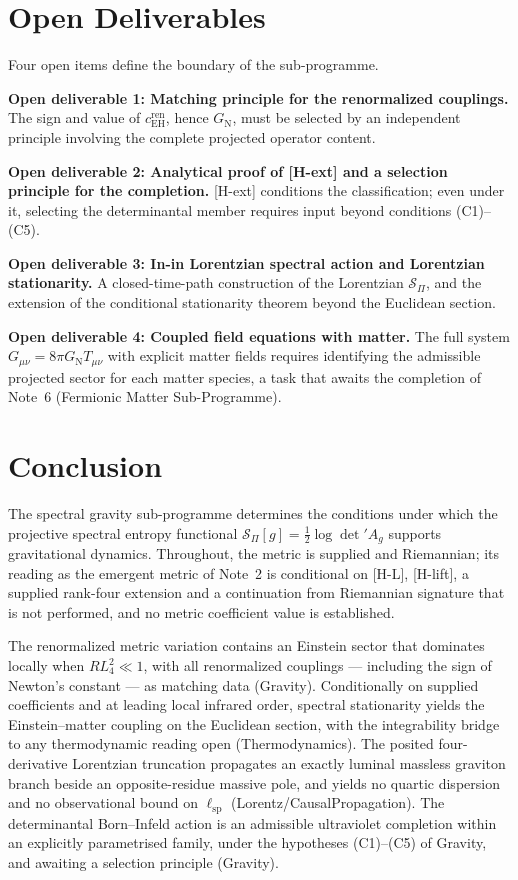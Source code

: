 \documentclass[11pt,a4paper]{article}
\theoremstyle{definition}
\newcommand{\SPI}{\mathcal{S}_\Pi}
\newcommand{\lsp}{\ell_{\mathrm{sp}}}
\newcommand{\GN}{G_{\mathrm{N}}}
\newcommand{\cEH}{c_{\mathrm{EH}}}
\begin{document}
  \section{Open Deliverables}
    \label{sec:open}

    Four open items define the boundary of the sub-programme.

    \textbf{Open deliverable 1: Matching principle for the renormalized couplings.}
    The sign and value of $\cEH^{\mathrm{ren}}$, hence $\GN$, must be selected by an
    independent principle involving the complete projected operator content.

    \textbf{Open deliverable 2: Analytical proof of [H-ext] and a selection principle for
    the completion.}
    [H-ext] conditions the classification; even under it, selecting the determinantal
    member requires input beyond conditions (C1)--(C5).

    \textbf{Open deliverable 3: In-in Lorentzian spectral action and Lorentzian
    stationarity.}
    A closed-time-path construction of the Lorentzian $\SPI$, and the extension of the
    conditional stationarity theorem beyond the Euclidean section.

    \textbf{Open deliverable 4: Coupled field equations with matter.}
    The full system $G_{\mu\nu} = 8\pi\GN T_{\mu\nu}$ with explicit matter fields requires
    identifying the admissible projected sector for each matter species, a task that awaits
    the completion of Note~6 (Fermionic Matter Sub-Programme).

  \section{Conclusion}
    \label{sec:conclusion}

    The spectral gravity sub-programme determines the conditions under which the projective
    spectral entropy functional $\SPI[g] = \tfrac{1}{2}\log\det' A_g$ supports gravitational
    dynamics.
    Throughout, the metric is supplied and Riemannian; its reading as the emergent metric of Note~2 is conditional
    on [H-L], [H-lift], a supplied rank-four extension and a continuation from Riemannian signature that is not
    performed, and no metric coefficient value
    is established.

    The renormalized metric variation contains an Einstein sector that dominates locally
    when $RL_4^2 \ll 1$, with all renormalized couplings --- including the sign of Newton's
    constant --- as matching data (Gravity).
    Conditionally on supplied coefficients and at leading local infrared order, spectral stationarity yields the
    Einstein--matter coupling on the Euclidean section, with the integrability bridge to any
    thermodynamic reading open (Thermodynamics).
    The posited four-derivative Lorentzian truncation propagates an exactly luminal massless
    graviton branch beside an opposite-residue massive pole, and yields no quartic
    dispersion and no observational bound on $\lsp$ (Lorentz/CausalPropagation).
    The determinantal Born--Infeld action is an admissible ultraviolet completion within an
    explicitly parametrised family, under the hypotheses (C1)--(C5) of Gravity, and awaiting a
    selection principle (Gravity).
\end{document}
